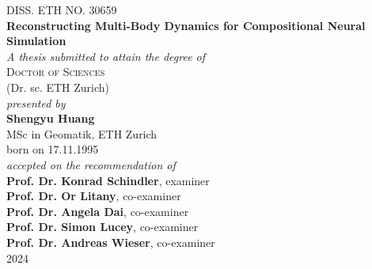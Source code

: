 
\begin{center}
	\large{DISS. ETH NO. 30659}\\
\vspace{2 cm}
	\Large{\textbf{Reconstructing Multi-Body Dynamics for Compositional Neural Simulation}}\\
\vspace{1.5 cm}
	\large{\emph{A thesis submitted to attain the degree of}}\\
\vspace{0.5cm}
	\large{\textsc{Doctor of Sciences}}\\
\vspace{0.3cm}
	\large{(Dr. sc. ETH Zurich)}\\
\vspace{1.2cm}
	\large{\emph{presented by}}\\
\vspace{1.2cm}
	\large{\textbf{Shengyu Huang}}\\
\vspace{0.3cm}
	\large{MSc in Geomatik, ETH Zurich}\\
\vspace{1.2cm}
	\large{born on 17.11.1995}\\
\vspace{1.2cm}
	\large{\emph{accepted on the recommendation of}}\\
\vspace{1.2cm}
	\large{\textbf{Prof. Dr. Konrad Schindler}, examiner %
}\\
\vspace{0.1cm}
	\large{\textbf{Prof. Dr. Or Litany}, co-examiner %
}\\
\vspace{0.1cm}
	\large{\textbf{Prof. Dr. Angela Dai}, co-examiner %
}\\
\vspace{0.1cm}
	\large{\textbf{Prof. Dr. Simon Lucey}, co-examiner %
}\\
\vspace{0.1cm}
	\large{\textbf{Prof. Dr. Andreas Wieser}, co-examiner %
}\\

\vspace{1.2cm}
	\large{2024}
\end{center}


